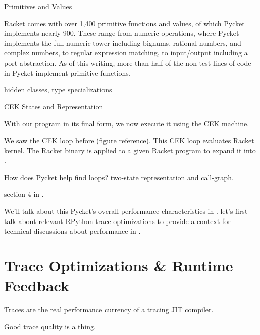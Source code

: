         Primitives and Values

        Racket comes with over 1,400 primitive functions and values, of which Pycket implements nearly 900. These range from numeric operations, where Pycket implements the full numeric tower including bignums, rational numbers, and complex numbers, to regular expression matching, to input/output including a port abstraction. As of this writing, more than half of the non-test lines of code in Pycket implement primitive functions.

        hidden classes, type specializations

        CEK States and Representation

        With our program in its final form, we now execute it using the CEK machine.

        \begin{paragraph-here}
            We saw the CEK loop before (figure reference). This CEK loop evaluates Racket kernel. The Racket binary is applied to a given Racket program to expand it into .
        \end{paragraph-here}


        \begin{paragraph-here}
               How does Pycket help find loops? two-state representation and call-graph.

               section 4 in \cite{pycketmain}.
        \end{paragraph-here}


        \begin{paragraph-here}
            We'll talk about this Pycket's overall performance characteristics in . let's first talk about relevant RPython trace optimizations to provide a context for technical discussions about performance in .
        \end{paragraph-here}


    \section{Trace Optimizations \& Runtime Feedback}

    \begin{paragraph-here}
        Traces are the real performance currency of a tracing JIT compiler.

        Good trace quality is a thing.
    \end{paragraph-here}


